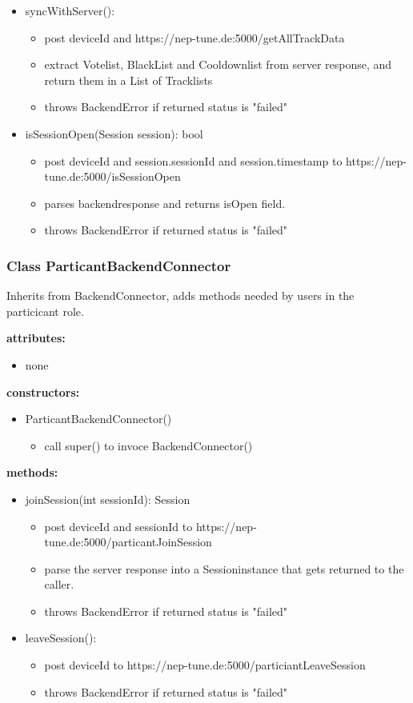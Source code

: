 \documentclass[oneside, nenglish]{sdqtechreport}
\begin{document}
\begin{itemize}
     \item syncWithServer():
     \begin{itemize}
         \item post deviceId and https://nep-tune.de:5000/getAllTrackData
         \item extract Votelist, BlackList and Cooldownlist from server response, and 
         return them in a List of Tracklists 
         \item throws BackendError if returned status is "failed"
     \end{itemize}
     \item isSessionOpen(Session session): bool
     \begin{itemize}
         \item post deviceId and session.sessionId and session.timestamp to https://nep-tune.de:5000/isSessionOpen
         \item parses backendresponse and returns isOpen field. 
         \item throws BackendError if returned status is "failed" 
     \end{itemize}
 \end{itemize}

 \subsubsection{Class ParticantBackendConnector}
Inherits from BackendConnector, adds methods needed by users in the particicant role.

\textbf{attributes:}
\begin{itemize}
     \item none
\end{itemize}
\textbf{constructors:}
\begin{itemize}
    \item ParticantBackendConnector()
    \begin{itemize}
        \item call super() to invoce BackendConnector()
    \end{itemize}
\end{itemize}
\textbf{methods:}
\begin{itemize}
    \item joinSession(int sessionId): Session
    \begin{itemize}
          \item post deviceId and sessionId to https://nep-tune.de:5000/particantJoinSession
          \item parse the server response into a Sessioninstance that gets returned to the caller.
         \item throws BackendError if returned status is "failed"
     \end{itemize}
     \item leaveSession():
     \begin{itemize}
         \item post deviceId to https://nep-tune.de:5000/particiantLeaveSession
         \item throws BackendError if returned status is "failed"
     \end{itemize}
\end{itemize}
\end{document}
